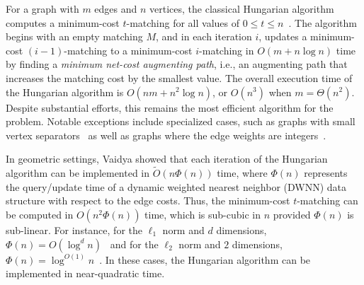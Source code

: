 For a graph with $m$ edges and $n$ vertices, the classical Hungarian algorithm computes a minimum-cost $t$-matching for all values of $0\le t\le n$~\cite{kuhn1955hungarian, phatak2022computing}. The algorithm begins with an empty matching $M$, and in each iteration $i$, updates a minimum-cost $(i-1)$-matching to a minimum-cost $i$-matching in $O(m+n\log n)$ time by finding a \emph{minimum net-cost augmenting path}, i.e., an augmenting path that increases the matching cost by the smallest value. The overall execution time of the Hungarian algorithm is $O(nm+n^2\log n)$, or $O(n^3)$ when $m = \Theta(n^2)$.  
Despite substantial efforts, this remains the most efficient algorithm for the problem. Notable exceptions include specialized cases, such as graphs with small vertex separators~\cite{lipton1980applications} as well as graphs where the edge weights are integers~\cite{chen2022maximum,gt_sjc89,gt_jacm91}. 


In geometric settings, Vaidya showed that each iteration of the Hungarian algorithm can be implemented in $\tilde{O}(n\Phi(n))$ time, where $\Phi(n)$ represents the query/update time of a dynamic weighted nearest neighbor (DWNN) data structure with respect to the edge costs. Thus, the minimum-cost $t$-matching can be computed in $O(n^2 \Phi(n))$ time, which is sub-cubic in $n$ provided $\Phi(n)$ is sub-linear.  For instance, for the $\ell_1$ norm and $d$ dimensions, $\Phi(n)=O(\log^d n)$~\cite{vaidya1989geometry} and for the $\ell_2$ norm and $2$ dimensions, $\Phi(n)=\log^{O(1)}n$~\cite{kaplan2020dynamic}. In these cases, the Hungarian algorithm can be implemented in near-quadratic time.  

